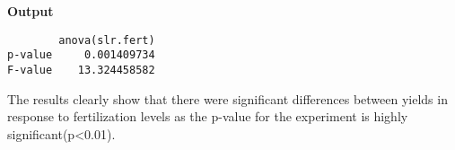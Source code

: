 \documentclass[a4paper]{article}
\begin{document}
\textbf{Output}
\begin{lstlisting}
        anova(slr.fert)
p-value     0.001409734
F-value    13.324458582
\end{lstlisting}
The results clearly show that there were significant differences between yields in response to fertilization levels as the p-value for the experiment is highly significant(p<0.01). 
\end{document}

